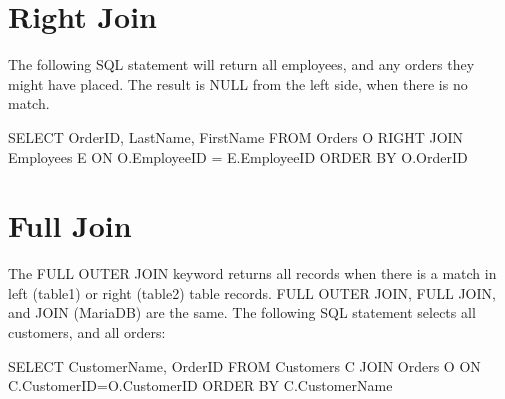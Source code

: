 \documentclass[
]{book}
\newenvironment{Shaded}{\begin{snugshade}}{\end{snugshade}}
\newcommand{\AttributeTok}[1]{\textcolor[rgb]{0.13,0.29,0.53}{#1}}
\newcommand{\FunctionTok}[1]{\textcolor[rgb]{0.13,0.29,0.53}{\textbf{#1}}}
\newcommand{\NormalTok}[1]{#1}
\newcommand{\OtherTok}[1]{\textcolor[rgb]{0.56,0.35,0.01}{#1}}
\newcommand{\SpecialCharTok}[1]{\textcolor[rgb]{0.81,0.36,0.00}{\textbf{#1}}}
\newcommand{\StringTok}[1]{\textcolor[rgb]{0.31,0.60,0.02}{#1}}
\begin{document}
\hypertarget{right-join}{%
\section{Right Join}\label{right-join}}

The following SQL statement will return all employees, and any orders they might have placed. The result is NULL from the left side, when there is no match.

\begin{Shaded}
\begin{Highlighting}[]
\NormalTok{SELECT OrderID, LastName, FirstName}
\NormalTok{  FROM Orders O}
\NormalTok{    RIGHT JOIN Employees E}
\NormalTok{      ON O.EmployeeID }\OtherTok{=}\NormalTok{ E.EmployeeID}
\NormalTok{        ORDER BY O.OrderID}
\end{Highlighting}
\end{Shaded}

\begin{Shaded}
\end{Shaded}

\hypertarget{full-join}{%
\section{Full Join}\label{full-join}}

The FULL OUTER JOIN keyword returns all records when there is a match in left (table1) or right (table2) table records. FULL OUTER JOIN, FULL JOIN, and JOIN (MariaDB) are the same. The following SQL statement selects all customers, and all orders:

\begin{Shaded}
\begin{Highlighting}[]
\NormalTok{SELECT CustomerName, OrderID}
\NormalTok{  FROM Customers C}
\NormalTok{    JOIN Orders O}
\NormalTok{      ON C.CustomerID}\OtherTok{=}\NormalTok{O.CustomerID}
\NormalTok{        ORDER BY C.CustomerName}
\end{Highlighting}
\end{Shaded}
\end{document}
